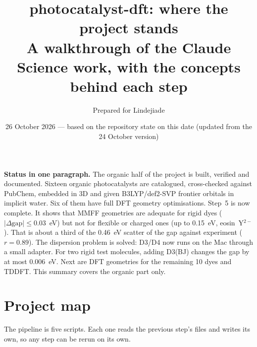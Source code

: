 \documentclass[11pt,a4paper]{article}
\title{\textbf{photocatalyst-dft: where the project stands}\\[4pt]
\large A walkthrough of the Claude Science work, with the concepts behind each step}
\author{Prepared for Lindejiade}
\date{26 October 2026 --- based on the repository state on this date (updated from the 24 October version)}
\begin{document}
\maketitle

\noindent\textbf{Status in one paragraph.} The organic half of the project is built, verified and
documented. Sixteen organic photocatalysts are catalogued, cross-checked against PubChem, embedded in
3D and given B3LYP/def2-SVP frontier orbitals in implicit water. Six of them have full DFT geometry
optimisations. Step~5 is now complete. It shows that MMFF geometries are adequate for rigid dyes
($|\Delta\text{gap}| \le 0.03$~eV) but not for flexible or charged ones (up to
0.15~eV, eosin~Y$^{2-}$). That is about a third of the 0.46~eV scatter of the
gap against experiment ($r = 0.89$). The dispersion problem is solved: D3/D4 now runs on the Mac
through a small adapter. For two rigid test molecules, adding D3(BJ) changes the gap by at most
0.006~eV. Next are DFT geometries for the remaining 10 dyes and TDDFT. This summary
covers the organic part only.

\tableofcontents

\section{Project map}

The pipeline is five scripts. Each one reads the previous step's files and writes its own, so any
step can be rerun on its own.
\end{document}
